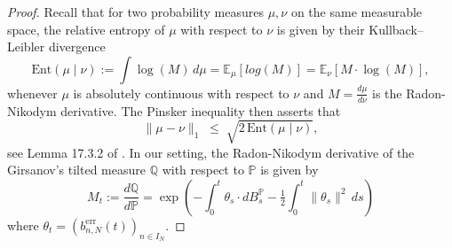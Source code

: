 \documentclass[12pt,reqno]{amsart}
\theoremstyle{plain}
\theoremstyle{definition}
\theoremstyle{remark}
\begin{document}
\begin{proof}
Recall that for two probability measures $\mu,\nu$ on the same measurable space, the 
relative entropy of $\mu$ with respect to $\nu$ is given by their Kullback–Leibler divergence 
\begin{equation}
\mathrm{Ent}(\mu\!\mid\!\nu)
:= \int \log\!\left(M \right)\,d\mu = \mathbb{E}_{\mu} [log(M)]=\mathbb{E}_{\nu} [M \cdot \log(M)],
\end{equation}
whenever $\mu$ is absolutely continuous with respect to $\nu$ and $M=\frac{d\mu}{d\nu}$ is the Radon-Nikodym derivative. The Pinsker inequality then asserts that
\begin{equation}\label{eq:pinsker}
\|\mu-\nu\|_{1}
\;\le\; \sqrt{2 \, \mathrm{Ent}(\mu\!\mid\!\nu)},
\end{equation}
see Lemma 17.3.2 of \cite{CT}. 
\medskip
In our setting, the Radon-Nikodym derivative of the Girsanov’s tilted measure $\mathbb Q$ with respect to $\mathbb{P}$ is given by 
\begin{equation}
M_t:=\frac{d\mathbb Q}{d\mathbb P}
=\exp\!\left(-\int_0^t \theta_s\!\cdot dB^{\mathbb{P}}_s-\tfrac12\int_0^t\|\theta_s\|^2\,ds\right)
\end{equation}
where $\theta_t=(b^{\mathrm{err}}_{n,N}(t))_{n\in I_N}$. 




\end{proof}
\end{document}
